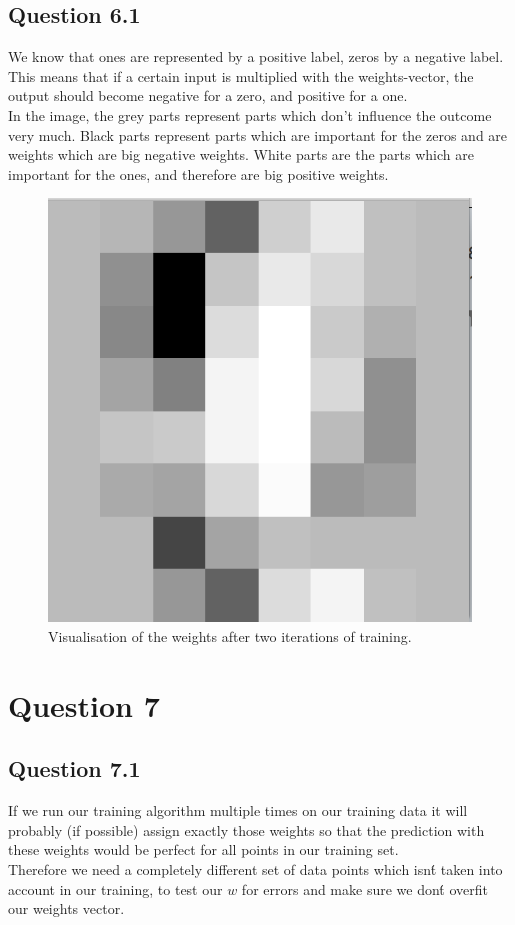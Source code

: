 \documentclass[11pt,twoside,a4paper]{article}
\begin{document}
	\subsection{Question 6.1}
	We know that ones are represented by a positive label, zeros by a negative label. This means that if a certain input is multiplied with the weights-vector, the output should become negative for a zero, and positive for a one. \\
	In the image, the grey parts represent parts which don't influence the outcome very much. Black parts represent parts which are important for the zeros and are weights which are big negative weights. White parts are the parts which are important for the ones, and therefore are big positive weights. 
	
\begin{figure}[ht]
    \centering
    \includegraphics[scale=0.5]{digits_weights.png}
    \caption{Visualisation of the weights after two iterations of training.}
\end{figure}	
	
\section{Question 7}

	\subsection{Question 7.1}
	If we run our training algorithm multiple times on our training data it will probably (if possible) assign exactly those weights so that the prediction with these weights would be perfect for all points in our training set. \\
	Therefore we need a completely different set of data points which isn\'t taken into account in our training, to test our $w$ for errors and make sure we don\'t overfit our weights vector.
	
\end{document}
